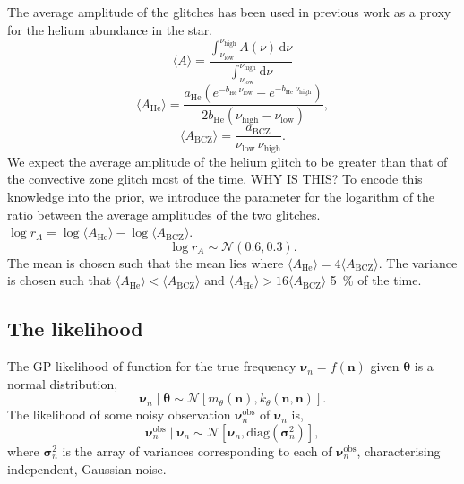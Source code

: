 \documentclass[linenumbers,modern]{aastex631dm}
\newcommand{\helium}{\mathrm{He}}
\newcommand{\bcz}{\mathrm{BCZ}}
\newcommand{\dd}{\mathrm{d}}
\begin{document}
The average amplitude of the glitches has been used in previous work as a proxy
for the helium abundance in the star.
%
\begin{equation}
    \langle A \rangle = \frac{
        \int_{\nu_\mathrm{low}}^{\nu_\mathrm{high}} A(\nu) \, \dd \nu
    }{
        \int_{\nu_\mathrm{low}}^{\nu_\mathrm{high}} \dd \nu
    }
\end{equation}
%
%
\begin{equation}
    \langle A_\helium \rangle = \frac{
        a_\helium \left(
            e^{- b_\helium \, \nu_\mathrm{low}}
            - e^{- b_\helium \, \nu_\mathrm{high}}
        \right)
    }{2 b_\helium (\nu_\mathrm{high} - \nu_\mathrm{low})},
\end{equation}
%
%
\begin{equation}
    \langle A_\bcz \rangle
    = \frac{a_\bcz}{\nu_\mathrm{low} \, \nu_\mathrm{high}}.
\end{equation}
%
We expect the average amplitude of the helium glitch to be greater than that of
the convective zone glitch most of the time. WHY IS THIS? To encode this
knowledge into the prior, we introduce the parameter for the logarithm of the
ratio between the average amplitudes of the two glitches.
\(\log r_A = \log \langle A_\helium \rangle - \log \langle A_\bcz \rangle\).
%
\begin{equation}
    \log r_A \sim \mathcal{N}(0.6, 0.3).
\end{equation}
%
The mean is chosen such that the mean lies where
\(\langle A_\helium \rangle = 4 \langle A_\bcz \rangle\). The variance is
chosen such that \(\langle A_\helium \rangle < \langle A_\bcz \rangle\) and
\(\langle A_\helium \rangle > 16 \langle A_\bcz \rangle\) \SI{5}{\percent} of
the time.


\subsection{The likelihood}

The GP likelihood of function for the true frequency \(\bm \nu_n = f(\bm n)\)
given \(\bm\theta\) is a normal distribution,
%
\begin{equation}
    \bm \nu_n \mid \bm\theta \sim
    \mathcal{N}\left[m_\theta(\bm n), k_\theta(\bm n, \bm n)\right].
\end{equation}
%
The likelihood of some noisy observation \(\bm \nu^\mathrm{obs}_n\) of
\(\bm \nu_n\) is,
%
\begin{equation}
    \bm\nu^\mathrm{obs}_n \mid \bm \nu_n
    \sim \mathcal{N}\left[\bm \nu_n, \mathrm{diag}(\bm\sigma_n^2)\right],
\end{equation}
%
where \(\bm\sigma_n^2\) is the array of variances corresponding to
each of \(\bm\nu^\mathrm{obs}_n\), characterising independent, Gaussian noise.
\end{document}
